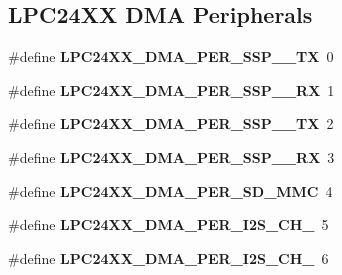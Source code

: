 \subsection*{L\+P\+C24\+XX D\+MA Peripherals}
\begin{DoxyCompactItemize}
\item 
\mbox{\label{group__lpc__dma_gafb813592d5bfe8e39fc3231af778ef8d}} 
\#define {\bfseries L\+P\+C24\+X\+X\+\_\+\+D\+M\+A\+\_\+\+P\+E\+R\+\_\+\+S\+S\+P\+\_\+\_\+\+TX}~0
\item 
\mbox{\label{group__lpc__dma_ga24bf28991650b0876c343d1004df9051}} 
\#define {\bfseries L\+P\+C24\+X\+X\+\_\+\+D\+M\+A\+\_\+\+P\+E\+R\+\_\+\+S\+S\+P\+\_\+\_\+\+RX}~1
\item 
\mbox{\label{group__lpc__dma_ga622c85a523cb9838aa0b476d81cb33c9}} 
\#define {\bfseries L\+P\+C24\+X\+X\+\_\+\+D\+M\+A\+\_\+\+P\+E\+R\+\_\+\+S\+S\+P\+\_\+\_\+\+TX}~2
\item 
\mbox{\label{group__lpc__dma_ga9d11ff97c450e7eccefbf21e1df2a516}} 
\#define {\bfseries L\+P\+C24\+X\+X\+\_\+\+D\+M\+A\+\_\+\+P\+E\+R\+\_\+\+S\+S\+P\+\_\+\_\+\+RX}~3
\item 
\mbox{\label{group__lpc__dma_ga2343fdd02975bff01e32bc3201a22af1}} 
\#define {\bfseries L\+P\+C24\+X\+X\+\_\+\+D\+M\+A\+\_\+\+P\+E\+R\+\_\+\+S\+D\+\_\+\+M\+MC}~4
\item 
\mbox{\label{group__lpc__dma_ga1d5f13e902c1467d94f43b7e284aa1f1}} 
\#define {\bfseries L\+P\+C24\+X\+X\+\_\+\+D\+M\+A\+\_\+\+P\+E\+R\+\_\+\+I2\+S\+\_\+\+C\+H\+\_}~5
\item 
\mbox{\label{group__lpc__dma_gae4a21fffa3c3f0de91d7b0944a58688e}} 
\#define {\bfseries L\+P\+C24\+X\+X\+\_\+\+D\+M\+A\+\_\+\+P\+E\+R\+\_\+\+I2\+S\+\_\+\+C\+H\+\_}~6
\end{DoxyCompactItemize}
